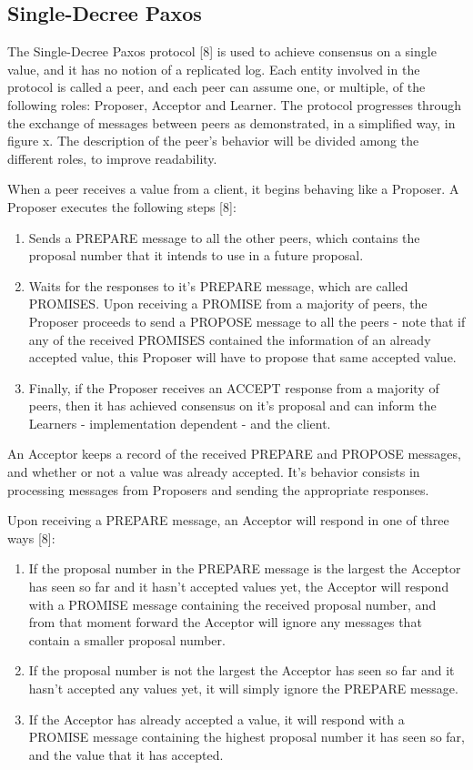 \subsection{Single-Decree Paxos}

The Single-Decree Paxos protocol [8] is used to achieve consensus on a single value, and it has no notion of a replicated log. Each entity involved in the protocol is called a peer, and each peer can assume one, or multiple, of the following roles: Proposer, Acceptor and Learner. The protocol progresses through the exchange of messages between peers as demonstrated, in a simplified way, in figure x. The description of the peer’s behavior will be divided among the different roles, to improve readability.

When a peer receives a value from a client, it begins behaving like a Proposer. A Proposer executes the following steps [8]:

\begin{enumerate}
  \item Sends a PREPARE message to all the other peers, which contains the proposal number that it intends to use in a future proposal.
  \item Waits for the responses to it’s PREPARE message, which are called PROMISES. Upon receiving a PROMISE from a majority of peers, the Proposer proceeds to send a PROPOSE message to all the peers - note that if any of the received PROMISES contained the information of an already accepted value, this Proposer will have to propose that same accepted value.
  \item Finally, if the Proposer receives an ACCEPT response from a majority of peers, then it has achieved consensus on it’s proposal and can inform the Learners - implementation dependent - and the client.
\end{enumerate}

An Acceptor keeps a record of the received PREPARE and PROPOSE messages, and whether or not a value was already accepted. It’s behavior consists in processing messages from Proposers and sending the appropriate responses.

Upon receiving a PREPARE message, an Acceptor will respond in one of three ways [8]:

\begin{enumerate}
  \item If the proposal number in the PREPARE message is the largest the Acceptor has seen so far and it hasn’t accepted values yet, the Acceptor will respond with a PROMISE message containing the received proposal number, and from that moment forward the Acceptor will ignore any messages that contain a smaller proposal number.
  \item If the proposal number is not the largest the Acceptor has seen so far and it hasn’t accepted any values yet, it will simply ignore the PREPARE message.
  \item If the Acceptor has already accepted a value, it will respond with a PROMISE message containing the highest proposal number it has seen so far, and the value that it has accepted.
\end{enumerate}

